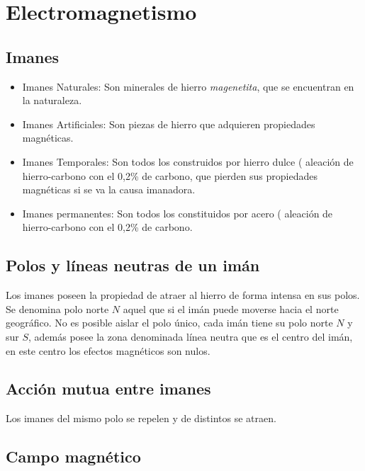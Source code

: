 \pagestyle{empty}
\section{Electromagnetismo}


\subsection{Imanes}

\begin{itemize}
    \item Imanes Naturales: Son minerales de hierro \emph{magenetita}, que se encuentran en la naturaleza.
    \item Imanes Artificiales: Son piezas de hierro que adquieren propiedades magnéticas.
    \item Imanes Temporales: Son todos los construidos por hierro dulce ( aleación de hierro-carbono con el 0,2\% de carbono, que pierden sus propiedades magnéticas si se va la causa imanadora.
    \item Imanes permanentes: Son todos los constituidos por acero ( aleación de hierro-carbono con el 0,2\% de carbono.
\end{itemize}

\subsection{Polos y líneas neutras de un imán}

Los imanes poseen la propiedad de atraer al hierro de forma intensa en sus polos. Se denomina polo norte $N$ aquel que si el imán puede moverse hacia el norte geográfico. No es posible aislar el polo único, cada imán tiene su polo norte $N$ y sur $S$, además posee la zona denominada línea neutra que es el centro del imán, en este centro los efectos magnéticos son nulos.

\subsection{Acción mutua entre imanes}

Los imanes del mismo polo se repelen y de distintos se atraen.

\subsection{Campo magnético}

